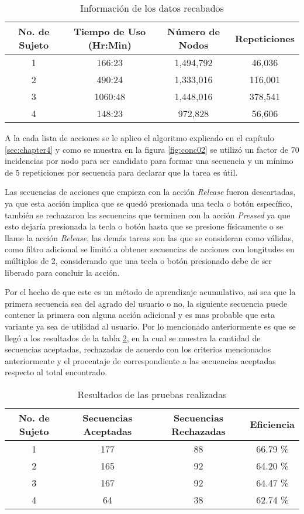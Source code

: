 \begin{table}[]
\centering
\begin{tabular}{cccc}
\hline
		No. de Sujeto	&   Tiempo de Uso (Hr:Min)		&	N\'umero de Nodos	&   Repeticiones 	\\   \hline
		1				&	166:23 						&	1,494,792			&	46,036				\\
		2				&	490:24						&	1,333,016			&	116,001				\\
		3				&	1060:48						&	1,448,016			&	378,541				\\
		4				&	148:23						&	972,828				&	56,606				\\ 
\hline
\end{tabular}
\caption{Informaci\'on de los datos recabados}
\label{infodata}
\end{table}

A la cada lista de acciones se le aplico el algoritmo explicado en el cap\'itulo \ref{sec:chapter4} y como se muestra en la figura \ref{fig:conc02} se utiliz\'o un factor de 70 incidencias por nodo para ser candidato para formar una secuencia y un m\'inimo de 5 repeticiones por secuencia para declarar que la tarea es \'util. 


Las secuencias de acciones que empieza con la acci\'on \emph{Release} fueron descartadas, ya que esta acci\'on implica que se qued\'o presionada una tecla o bot\'on espec\'ifico, tambi\'en se rechazaron las secuencias que terminen con la acci\'on \emph{Pressed} ya que esto dejar\'ia presionada la tecla o bot\'on hasta que se presione f\'isicamente o se llame la acci\'on \emph{Release}, las dem\'as tareas son las que se consideran como v\'alidas, como filtro adicional se limit\'o a obtener secuencias de acciones con longitudes en m\'ultiplos de 2, considerando que una tecla o bot\'on presionado debe de ser liberado para concluir la acci\'on.

Por el hecho de que este es un m\'etodo de aprendizaje acumulativo, as\'i sea que la primera secuencia sea del agrado del usuario o no, la siguiente secuencia puede contener la primera con alguna acci\'on adicional y es mas probable que esta variante ya sea de utilidad al usuario. Por lo mencionado anteriormente es que se lleg\'o a los resultados de la tabla \ref{tableRes}, en la cual se muestra la cantidad de secuencias aceptadas, rechazadas de acuerdo con los criterios mencionados anteriormente y el procentaje de correspondiente a las secuencias aceptadas respecto al total encontrado.


\begin{table}[]
\centering
\begin{tabular}{cccc}
\hline
		No. de Sujeto	&	Secuencias Aceptadas	&   Secuencias Rechazadas	&	Eficiencia		\\ \hline
		1				&	177						&	88						&	66.79 \%		\\
		2				&	165						&	92						&	64.20 \%		\\
		3				&	167						&	92						&	64.47 \%		\\
		4				&	64						&	38						&	62.74 \%		\\
\hline
\end{tabular}
\caption{Resultados de las pruebas realizadas}
\label{tableRes}
\end{table}

